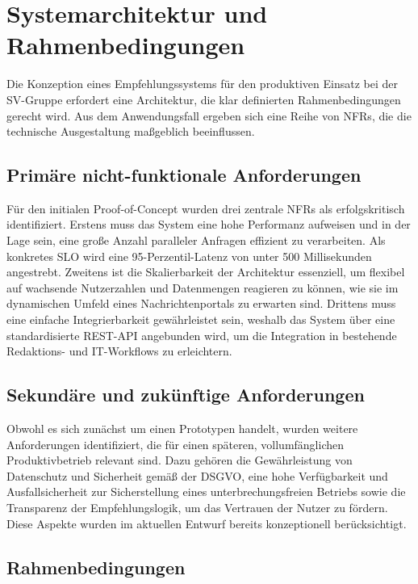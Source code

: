 \section{Systemarchitektur und Rahmenbedingungen}

Die Konzeption eines Empfehlungssystems für den produktiven Einsatz bei der SV-Gruppe erfordert eine Architektur, die klar definierten Rahmenbedingungen gerecht wird. 
Aus dem Anwendungsfall ergeben sich eine Reihe von \ac{NFR}s, die die technische Ausgestaltung maßgeblich beeinflussen.

\subsection{Primäre nicht-funktionale Anforderungen}
\label{sec:nfr}
Für den initialen Proof-of-Concept wurden drei zentrale NFRs als erfolgskritisch identifiziert. 
Erstens muss das System eine hohe Performanz aufweisen und in der Lage sein, eine große Anzahl paralleler Anfragen effizient zu verarbeiten. 
Als konkretes \ac{SLO} wird eine 95-Perzentil-Latenz von unter 500 Millisekunden angestrebt. 
Zweitens ist die Skalierbarkeit der Architektur essenziell, um flexibel auf wachsende Nutzerzahlen und Datenmengen reagieren zu können, 
wie sie im dynamischen Umfeld eines Nachrichtenportals zu erwarten sind. Drittens muss eine einfache Integrierbarkeit gewährleistet sein, 
weshalb das System über eine standardisierte REST-API angebunden wird, um die Integration in bestehende Redaktions- und IT-Workflows zu erleichtern.

\subsection{Sekundäre und zukünftige Anforderungen}
Obwohl es sich zunächst um einen Prototypen handelt, wurden weitere Anforderungen identifiziert, die für einen späteren, 
vollumfänglichen Produktivbetrieb relevant sind. Dazu gehören die Gewährleistung von Datenschutz und Sicherheit gemäß der \ac{DSGVO}, 
eine hohe Verfügbarkeit und Ausfallsicherheit zur Sicherstellung eines unterbrechungsfreien Betriebs sowie die Transparenz der Empfehlungslogik, 
um das Vertrauen der Nutzer zu fördern. Diese Aspekte wurden im aktuellen Entwurf bereits konzeptionell berücksichtigt.

\subsection{Rahmenbedingungen}

